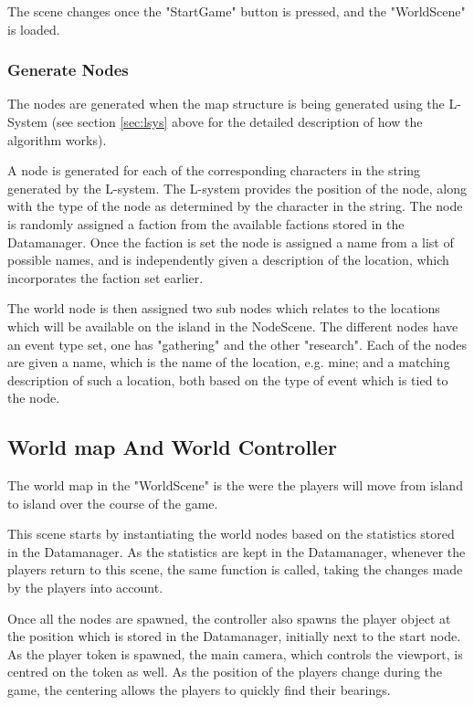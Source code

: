 The scene changes once the "StartGame" button is pressed, and the "WorldScene" is loaded.

\subsubsection{Generate Nodes}
The nodes are generated when the map structure is being generated using the L-System (see section \ref{sec:lsys} above for the detailed description of how the algorithm works).

A node is generated for each of the corresponding characters in the string generated by the L-system.
The L-system provides the position of the node, along with the type of the node as determined by the character in the string. 
The node is randomly assigned a faction from the available factions stored in the Datamanager. Once the faction is set the node is assigned a name from a list of possible names, and is independently given a description of the location, which incorporates the faction set earlier.

The world node is then assigned two sub nodes which relates to the locations which will be available on the island in the NodeScene. The different nodes have an event type set, one has "gathering" and the other "research".
Each of the nodes are given a name, which is the name of the location, e.g. mine; and a matching description of such a location, both based on the type of event which is tied to the node.

\subsection{World map And World Controller}
The world map in the "WorldScene" is the were the players will move from island to island over the course of the game. 

This scene starts by instantiating the world nodes based on the statistics stored in the Datamanager. As the statistics are kept in the Datamanager, whenever the players return to this scene, the same function is called, taking the changes made by the players into account. 

Once all the nodes are spawned, the controller also spawns the player object at the position which is stored in the Datamanager, initially next to the start node. 
As the player token is spawned, the main camera, which controls the viewport, is centred on the token as well. As the position of the players change during the game, the centering allows the players to quickly find their bearings.

